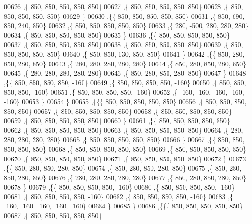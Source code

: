 \begin{DoxyCode}
00626    ,\{   850,   850,   850,   850,   850\}
00627    ,\{   850,   850,   850,   850,   850\}
00628    ,\{   850,   850,   850,   850,   850\}
00629    \}
00630   ,\{\{   850,   850,   850,   850,   850\}
00631    ,\{   850,   690,   850,   240,   850\}
00632    ,\{   850,   850,   850,   850,   850\}
00633    ,\{   280,  -500,   280,   280,   280\}
00634    ,\{   850,   850,   850,   850,   850\}
00635    \}
00636   ,\{\{   850,   850,   850,   850,   850\}
00637    ,\{   850,   850,   850,   850,   850\}
00638    ,\{   850,   850,   850,   850,   850\}
00639    ,\{   850,   850,   850,   850,   850\}
00640    ,\{   850,   850,   130,   850,   850\}
00641    \}
00642   ,\{\{   850,   280,   850,   280,   850\}
00643    ,\{   280,   280,   280,   280,   280\}
00644    ,\{   850,   280,   850,   280,   850\}
00645    ,\{   280,   280,   280,   280,   280\}
00646    ,\{   850,   280,   850,   280,   850\}
00647    \}
00648   ,\{\{   850,   850,   850,   850,  -160\}
00649    ,\{   850,   850,   850,   850,  -160\}
00650    ,\{   850,   850,   850,   850,  -160\}
00651    ,\{   850,   850,   850,   850,  -160\}
00652    ,\{  -160,  -160,  -160,  -160,  -160\}
00653    \}
00654   \}
00655  ,\{\{\{   850,   850,   850,   850,   850\}
00656    ,\{   850,   850,   850,   850,   850\}
00657    ,\{   850,   850,   850,   850,   850\}
00658    ,\{   850,   850,   850,   850,   850\}
00659    ,\{   850,   850,   850,   850,   850\}
00660    \}
00661   ,\{\{   850,   850,   850,   850,   850\}
00662    ,\{   850,   850,   850,   850,   850\}
00663    ,\{   850,   850,   850,   850,   850\}
00664    ,\{   280,   280,   280,   280,   280\}
00665    ,\{   850,   850,   850,   850,   850\}
00666    \}
00667   ,\{\{   850,   850,   850,   850,   850\}
00668    ,\{   850,   850,   850,   850,   850\}
00669    ,\{   850,   850,   850,   850,   850\}
00670    ,\{   850,   850,   850,   850,   850\}
00671    ,\{   850,   850,   850,   850,   850\}
00672    \}
00673   ,\{\{   850,   280,   850,   280,   850\}
00674    ,\{   850,   280,   850,   280,   850\}
00675    ,\{   850,   280,   850,   280,   850\}
00676    ,\{   280,   280,   280,   280,   280\}
00677    ,\{   850,   280,   850,   280,   850\}
00678    \}
00679   ,\{\{   850,   850,   850,   850,  -160\}
00680    ,\{   850,   850,   850,   850,  -160\}
00681    ,\{   850,   850,   850,   850,  -160\}
00682    ,\{   850,   850,   850,   850,  -160\}
00683    ,\{  -160,  -160,  -160,  -160,  -160\}
00684    \}
00685   \}
00686  ,\{\{\{   850,   850,   850,   850,   850\}
00687    ,\{   850,   850,   850,   850,   850\}

\end{DoxyCode}
